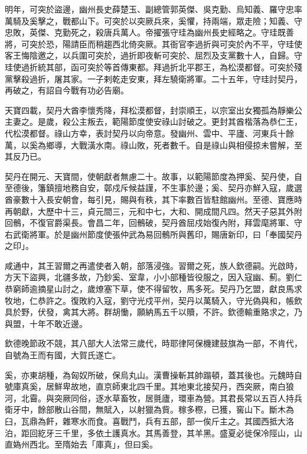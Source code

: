 \begin{pinyinscope}
 明年，可突於盜邊，幽州長史薛楚玉、副總管郭英傑、吳克勤、烏知義、羅守忠率萬騎及奚擊之，戰都山下。可突於以突厥兵來，奚懼，持兩端，眾走險；知義、守忠敗，英傑、克勤死之，殺唐兵萬人。帝擢張守珪為幽州長史經略之。守珪既善將，可突於恐，陽請臣而稍趨西北倚突厥。其衙官李過折與可突於內不平，守珪使客王悔陰邀之，以兵圍可突於，過折即夜斬可突於、屈烈及支黨數十人，自歸。守珪使過折統其部，函可突於等首傳東都。拜過折北平郡王，為松漠都督。可突於殘黨擊殺過折，屠其家。一子剌乾走安東，拜左驍衛將軍。二十五年，守珪討契丹，再破之，有詔自今戰有功必告廟。



 天寶四載，契丹大酋李懷秀降，拜松漠都督，封崇順王，以宗室出女獨孤為靜樂公主妻之。是歲，殺公主叛去，範陽節度使安祿山討破之。更封其酋楷落為恭仁王，代松漠都督。祿山方幸，表討契丹以向帝意。發幽州、雲中、平廬、河東兵十餘萬，以奚為鄉導，大戰潢水南。祿山敗，死者數千。自是祿山與相侵掠未嘗解，至其反乃已。



 契丹在開元、天寶間，使朝獻者無慮二十。故事，以範陽節度為押奚、契丹使，自至德後，籓鎮擅地務自安，鄣戍斥候益謹，不生事於邊；奚、契丹亦鮮入寇，歲選酋豪數十入長安朝會，每引見，賜與有秩，其下率數百皆駐館幽州。至德、寶應時再朝獻，大歷中十三，貞元間三，元和中七，大和、開成間凡四。然天子惡其外附回鶻，不復官爵渠長。會昌二年，回鶻破，契丹酋屈戍始復內附，拜雲麾將軍、守右武衛將軍。於是幽州節度使張仲武為易回鶻所與舊印，賜唐新印，曰「奉國契丹之印」。



 咸通中，其王習爾之再遣使者入朝，部落浸強。習爾之死，族人欽德嗣。光啟時，方天下盜興，北疆多故，乃鈔奚、室韋，小小部種皆役服之，因入寇幽、薊。劉仁恭窮師逾摘星山討之，歲燎塞下草，使不得留牧，馬多死。契丹乃乞盟，獻良馬求牧地，仁恭許之。復敗約入寇，劉守光戍平州，契丹以萬騎入，守光偽與和，帳飲具於野，伏發，禽其大將。群胡慟，願納馬五千以贖，不許。欽德輸重賂求之，乃與盟，十年不敢近邊。



 欽德晚節政不競，其八部大人法常三歲代，時耶律阿保機建鼓旗為一部，不肯代，自號為王而有國，大賀氏遂亡。



 奚，亦東胡種，為匈奴所破，保烏丸山。漢曹操斬其帥蹋頓，蓋其後也。元魏時自號庫真奚，居鮮卑故地，直京師東北四千里。其地東北接契丹，西突厥，南白狼河，北霫。與突厥同俗，逐水草畜牧，居氈廬，環車為營。其君長常以五百人持兵衛牙中，餘部散山谷間，無賦入，以射獵為貲。稼多穄，已獲，窖山下。斷木為臼，瓦鼎為飦，雜寒水而食。喜戰鬥，兵有五部，部一俟斤主之。其國西抵大洛泊，距回紇牙三千里，多依土護真水。其馬善登，其羊黑。盛夏必徙保冷陘山，山直媯州西北。至隋始去「庫真」，但曰奚。




\end{pinyinscope}
